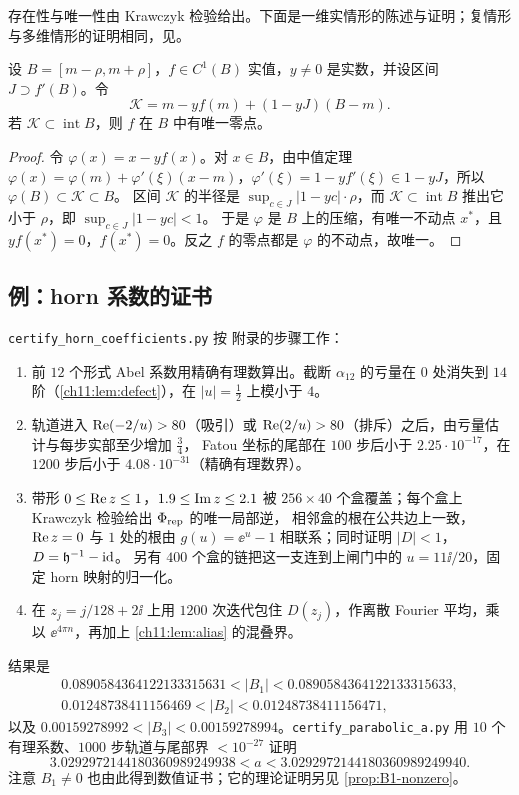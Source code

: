 存在性与唯一性由 Krawczyk 检验给出。下面是一维实情形的陈述与证明；复情形与多维情形的证明相同，见\cite[§5.1]{Neumaier1990}。

\begin{lemma}[Krawczyk]\label{ch11:lem:krawczyk}
设 $B=[m-\rho,m+\rho]$，$f\in C^1(B)$ 实值，$y\ne0$ 是实数，并设区间 $J\supset f'(B)$。令
\[
 \mathcal K=m-yf(m)+(1-yJ)(B-m) .
\]
若 $\mathcal K\subset\operatorname{int}B$，则 $f$ 在 $B$ 中有唯一零点。
\end{lemma}

\begin{proof}
令 $\varphi(x)=x-yf(x)$。对 $x\in B$，由中值定理 $\varphi(x)=\varphi(m)+\varphi'(\xi)(x-m)$，$\varphi'(\xi)=1-yf'(\xi)\in1-yJ$，所以 $\varphi(B)\subset\mathcal K\subset B$。
区间 $\mathcal K$ 的半径是 $\sup_{c\in J}|1-yc|\cdot\rho$，而 $\mathcal K\subset\operatorname{int}B$ 推出它小于 $\rho$，即 $\sup_{c\in J}|1-yc|<1$。
于是 $\varphi$ 是 $B$ 上的压缩，有唯一不动点 $x^*$，且 $yf(x^*)=0$，$f(x^*)=0$。反之 $f$ 的零点都是 $\varphi$ 的不动点，故唯一。
\end{proof}

\subsection{例：horn 系数的证书}\label{ch11:sec:horn-cert}
\texttt{certify\_\allowbreak{}horn\_\allowbreak{}coefficients.py} 按 \cite{KneserPaper} 附录的步骤工作：
\begin{enumerate}
\item 前 $12$ 个形式 Abel 系数用精确有理数算出。截断 $\alpha_{12}$ 的亏量在 $0$ 处消失到 $14$ 阶（\cref{ch11:lem:defect}），在 $|u|=\tfrac12$ 上模小于 $4$。
\item 轨道进入 $\operatorname{Re}(-2/u)>80$（吸引）或 $\operatorname{Re}(2/u)>80$（排斥）之后，由亏量估计与每步实部至少增加 $\tfrac34$，
  Fatou 坐标的尾部在 $100$ 步后小于 $2.25\cdot10^{-17}$，在 $1200$ 步后小于 $4.08\cdot10^{-31}$（精确有理数界）。
\item 带形 $0\le\operatorname{Re} z\le1$，$1.9\le\operatorname{Im} z\le2.1$ 被 $256\times40$ 个盒覆盖；每个盒上 Krawczyk 检验给出 $\Phi_{\mathrm{rep}}$ 的唯一局部逆，
  相邻盒的根在公共边上一致，$\operatorname{Re} z=0$ 与 $1$ 处的根由 $g(u)=\ee^u-1$ 相联系；同时证明 $|D|<1$，$D=\mathfrak h^{-1}-\mathrm{id}$。
  另有 $400$ 个盒的链把这一支连到上闸门中的 $u=11\ii/20$，固定 horn 映射的归一化。
\item 在 $z_j=j/128+2\ii$ 上用 $1200$ 次迭代包住 $D(z_j)$，作离散 Fourier 平均，乘以 $\ee^{4\pi n}$，再加上 \cref{ch11:lem:alias} 的混叠界。
\end{enumerate}
结果是
\begin{gather*}
 0.0890584364122133315631<|B_1|<0.0890584364122133315633,\\
 0.01248738411156469<|B_2|<0.01248738411156471,
\end{gather*}
以及 $0.00159278992<|B_3|<0.00159278994$。\texttt{certify\_\allowbreak{}parabolic\_\allowbreak{}a.py} 用 $10$ 个有理系数、$1000$ 步轨道与尾部界 $<10^{-27}$ 证明
\[
 3.0292972144180360989249938<a<3.0292972144180360989249940 .
\]
注意 $B_1\ne0$ 也由此得到数值证书；它的理论证明另见 \cref{prop:B1-nonzero}。

